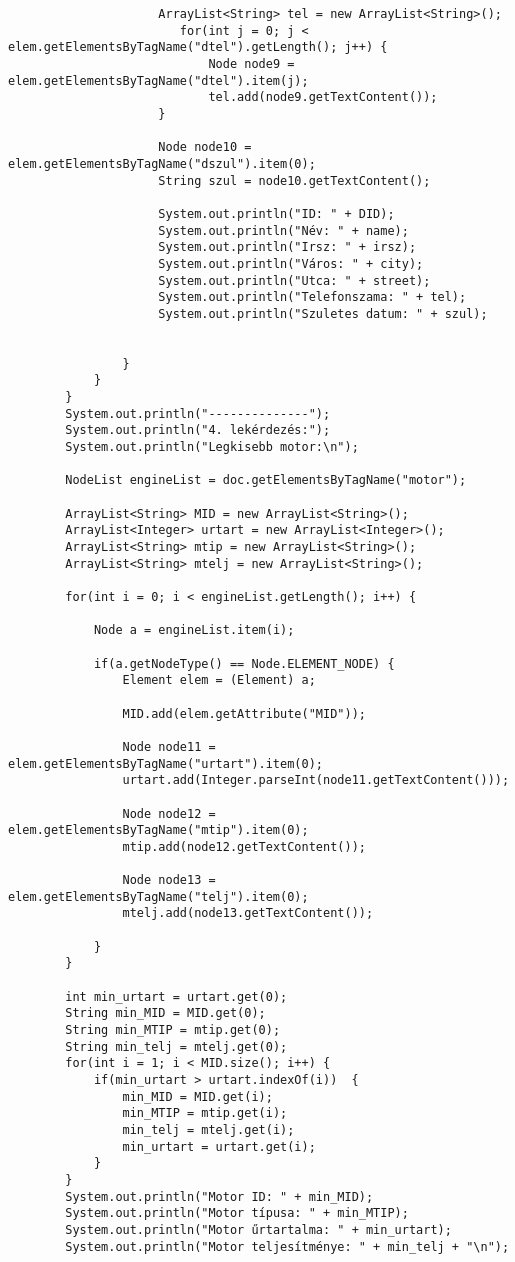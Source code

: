 \documentclass[14pt]{extarticle}
\begin{document}
\begin{normalsize}
\begin{verbatim}
					 ArrayList<String> tel = new ArrayList<String>();
		                for(int j = 0; j < elem.getElementsByTagName("dtel").getLength(); j++) {
		                	Node node9 = elem.getElementsByTagName("dtel").item(j);
		                	tel.add(node9.getTextContent());
		             }
		                
		             Node node10 = elem.getElementsByTagName("dszul").item(0);
		             String szul = node10.getTextContent();
		                
		             System.out.println("ID: " + DID);
		             System.out.println("Név: " + name);
		             System.out.println("Irsz: " + irsz);
		             System.out.println("Város: " + city);
		             System.out.println("Utca: " + street);
		             System.out.println("Telefonszama: " + tel);
		             System.out.println("Szuletes datum: " + szul);
		            
					
				}
			}
		}
		System.out.println("--------------");
		System.out.println("4. lekérdezés:");
		System.out.println("Legkisebb motor:\n");
		
		NodeList engineList = doc.getElementsByTagName("motor");
		
		ArrayList<String> MID = new ArrayList<String>();
		ArrayList<Integer> urtart = new ArrayList<Integer>();
		ArrayList<String> mtip = new ArrayList<String>();
		ArrayList<String> mtelj = new ArrayList<String>();
		
		for(int i = 0; i < engineList.getLength(); i++) {
			
			Node a = engineList.item(i);
			
			if(a.getNodeType() == Node.ELEMENT_NODE) {
				Element elem = (Element) a;
				
				MID.add(elem.getAttribute("MID"));
				
				Node node11 = elem.getElementsByTagName("urtart").item(0);
				urtart.add(Integer.parseInt(node11.getTextContent()));
				
				Node node12 = elem.getElementsByTagName("mtip").item(0);
				mtip.add(node12.getTextContent());
				
				Node node13 = elem.getElementsByTagName("telj").item(0);
				mtelj.add(node13.getTextContent());
				
			}
		}
		
		int min_urtart = urtart.get(0);
		String min_MID = MID.get(0);
		String min_MTIP = mtip.get(0);
		String min_telj = mtelj.get(0);
		for(int i = 1; i < MID.size(); i++) {
			if(min_urtart > urtart.indexOf(i))  {
				min_MID = MID.get(i);
				min_MTIP = mtip.get(i);
				min_telj = mtelj.get(i);
				min_urtart = urtart.get(i);
			}
		}
		System.out.println("Motor ID: " + min_MID);
		System.out.println("Motor típusa: " + min_MTIP);
		System.out.println("Motor űrtartalma: " + min_urtart);
		System.out.println("Motor teljesítménye: " + min_telj + "\n");
		

\end{verbatim}
\end{normalsize}
\end{document}
